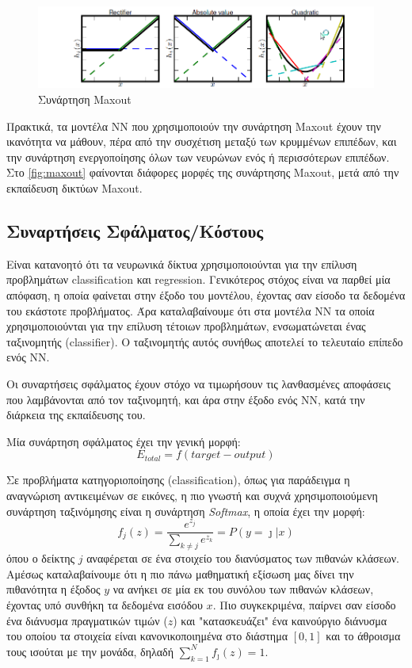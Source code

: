 \begin{figure}[!ht]
  \centering
  \includegraphics[width=1\textwidth]{./images/chapter3/maxout.png}
  \caption[Συνάρτηση Maxout]{Συνάρτηση Maxout}
  \label{fig:maxout}
\end{figure}

Πρακτικά, τα μοντέλα ΝΝ που χρησιμοποιούν την συνάρτηση Maxout έχουν την
ικανότητα να μάθουν, πέρα από την συσχέτιση μεταξύ των κρυμμένων επιπέδων,
και την συνάρτηση ενεργοποίησης όλων των νευρώνων ενός ή περισσότερων
επιπέδων.
Στο \autoref{fig:maxout} φαίνονται διάφορες μορφές της συνάρτησης Maxout,
μετά από την εκπαίδευση δικτύων Maxout.

\subsection{Συναρτήσεις Σφάλματος/Κόστους}

Είναι κατανοητό ότι τα νευρωνικά δίκτυα χρησιμοποιούνται για την επίλυση
προβλημάτων classification και regression. Γενικότερος στόχος είναι να παρθεί
μία απόφαση, η οποία φαίνεται στην έξοδο του μοντέλου, έχοντας σαν είσοδο
τα δεδομένα του εκάστοτε προβλήματος.
Άρα καταλαβαίνουμε ότι στα μοντέλα ΝΝ τα οποία χρησιμοποιούνται για την επίλυση
τέτοιων προβλημάτων, ενσωματώνεται ένας ταξινομητής (classifier). Ο ταξινομητής
αυτός συνήθως αποτελεί το τελευταίο επίπεδο ενός ΝΝ.

Οι συναρτήσεις σφάλματος έχουν στόχο να τιμωρήσουν τις λανθασμένες αποφάσεις
που λαμβάνονται από τον ταξινομητή, και άρα στην έξοδο ενός ΝΝ,
κατά την διάρκεια της εκπαίδευσης του.

Μία συνάρτηση σφάλματος έχει την γενική μορφή:
\[
  E_{total} = f(target - output)
\]

Σε προβλήματα κατηγοριοποίησης (classification), όπως για παράδειγμα
η αναγνώριση αντικειμένων σε εικόνες, η πιο γνωστή και συχνά χρησιμοποιούμενη συνάρτηση ταξινόμησης
είναι η συνάρτηση \emph{Softmax}, η οποία έχει την μορφή:
\begin{equation*}
  f_{j}(z) = \frac{e^{z_{j}}}{\sum_{k\not=j}e^{z_{k}}} = P(y=\jmath|x)
\end{equation*}
όπου ο δείκτης $j$ αναφέρεται σε ένα στοιχείο του διανύσματος των πιθανών κλάσεων.
Αμέσως καταλαβαίνουμε ότι η πιο πάνω μαθηματική εξίσωση μας δίνει την πιθανότητα
η έξοδος $y$ να ανήκει σε μία εκ του συνόλου των πιθανών κλάσεων, έχοντας
υπό συνθήκη τα δεδομένα εισόδου $x$.
Πιο συγκεκριμένα, παίρνει σαν είσοδο ένα διάνυσμα πραγματικών τιμών ($z$)
και "κατασκευάζει" ένα καινούργιο διάνυσμα του οποίου τα στοιχεία είναι
κανονικοποιημένα στο διάστημα $[0, 1]$ και το άθροισμα τους ισούται με την μονάδα,
δηλαδή $\sum_{k=1}^{N} f_{\jmath}(z) = 1$.

